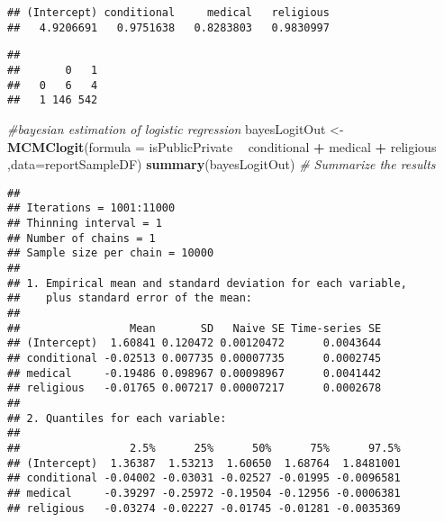 \documentclass[]{article}
\newenvironment{Shaded}{\begin{snugshade}}{\end{snugshade}}
\newcommand{\CommentTok}[1]{\textcolor[rgb]{0.56,0.35,0.01}{\textit{#1}}}
\newcommand{\DataTypeTok}[1]{\textcolor[rgb]{0.13,0.29,0.53}{#1}}
\newcommand{\KeywordTok}[1]{\textcolor[rgb]{0.13,0.29,0.53}{\textbf{#1}}}
\newcommand{\NormalTok}[1]{#1}
\newcommand{\OperatorTok}[1]{\textcolor[rgb]{0.81,0.36,0.00}{\textbf{#1}}}
\newcommand{\StringTok}[1]{\textcolor[rgb]{0.31,0.60,0.02}{#1}}
\begin{document}
\begin{verbatim}
## (Intercept) conditional     medical   religious 
##   4.9206691   0.9751638   0.8283803   0.9830997
\end{verbatim}

\begin{Shaded}
\end{Shaded}

\begin{verbatim}
##    
##       0   1
##   0   6   4
##   1 146 542
\end{verbatim}

\begin{Shaded}
\begin{Highlighting}[]
\CommentTok{#bayesian estimation of logistic regression}
\NormalTok{bayesLogitOut <-}\StringTok{ }\KeywordTok{MCMClogit}\NormalTok{(}\DataTypeTok{formula =}\NormalTok{ isPublicPrivate }\OperatorTok{~}\StringTok{ }\NormalTok{conditional }\OperatorTok{+}\StringTok{ }\NormalTok{medical }\OperatorTok{+}\StringTok{ }\NormalTok{religious ,}\DataTypeTok{data=}\NormalTok{reportSampleDF)}
\KeywordTok{summary}\NormalTok{(bayesLogitOut) }\CommentTok{# Summarize the results}
\end{Highlighting}
\end{Shaded}

\begin{verbatim}
## 
## Iterations = 1001:11000
## Thinning interval = 1 
## Number of chains = 1 
## Sample size per chain = 10000 
## 
## 1. Empirical mean and standard deviation for each variable,
##    plus standard error of the mean:
## 
##                 Mean       SD   Naive SE Time-series SE
## (Intercept)  1.60841 0.120472 0.00120472      0.0043644
## conditional -0.02513 0.007735 0.00007735      0.0002745
## medical     -0.19486 0.098967 0.00098967      0.0041442
## religious   -0.01765 0.007217 0.00007217      0.0002678
## 
## 2. Quantiles for each variable:
## 
##                 2.5%      25%      50%      75%      97.5%
## (Intercept)  1.36387  1.53213  1.60650  1.68764  1.8481001
## conditional -0.04002 -0.03031 -0.02527 -0.01995 -0.0096581
## medical     -0.39297 -0.25972 -0.19504 -0.12956 -0.0006381
## religious   -0.03274 -0.02227 -0.01745 -0.01281 -0.0035369
\end{verbatim}
\end{document}
